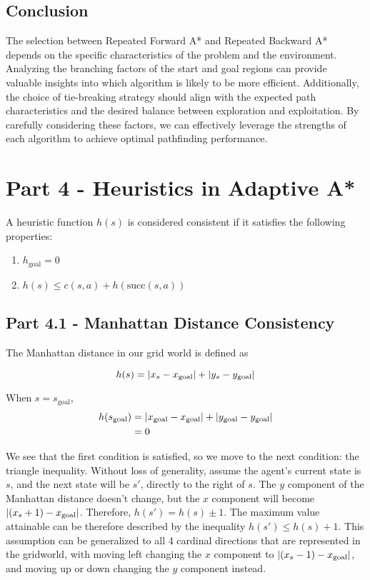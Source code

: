 \documentclass[12pt]{article}
\begin{document}
\subsection{Conclusion}

The selection between Repeated Forward A* and Repeated Backward A* depends on the specific characteristics of the problem and the environment. 
Analyzing the branching factors of the start and goal regions can provide valuable insights into which algorithm is likely to be more efficient. 
Additionally, 
the choice of tie-breaking strategy should align with the expected path characteristics and the desired balance between exploration and exploitation. 
By carefully considering these factors, 
we can effectively leverage the strengths of each algorithm to achieve optimal pathfinding performance. 



\section{Part 4 - Heuristics in Adaptive A*}

A heuristic function 
$h(s)$ 
is considered consistent if it satisfies the following properties:

\begin{enumerate}
    \item $h_{\text{goal}} = 0$
    \item $h(s) \leq c(s, a) + h(\text{succ} (s, a))$
\end{enumerate}

\subsection{Part 4.1 - Manhattan Distance Consistency}

The Manhattan distance in our grid world is defined as

$$
h(s) = \left\lvert x_s - x_{\text{goal}} \right\rvert + \left\lvert y_s - y_{\text{goal}} \right\rvert
$$

When $s = s_\text{goal}$,
\begin{align*}
h(s_\text{goal}) &= \left\lvert x_{\text{goal}} - x_{\text{goal}} \right\rvert + \left\lvert y_{\text{goal}} - y_{\text{goal}} \right\rvert \\
&= 0\
\end{align*}

We see that the first condition is satisfied,
so we move to the next condition:
the triangle inequality.
Without loss of generality,
assume the agent's current state is $s$,
and the next state will be $s'$,
directly to the right of $s$.
The $y$ component of the Manhattan distance doesn't change,
but the $x$ component will become 
$\left\lvert(x_s + 1) - x_{\text{goal}} \right\rvert$.
Therefore,
$h(s') = h(s) \pm 1$.
The maximum value attainable can be therefore described by the inequality 
$h(s') \leq h(s) + 1$.
This assumption can be generalized to all 4 cardinal directions that are represented in the gridworld,
with moving left changing the $x$ component to $\left\lvert(x_s - 1) - x_{\text{goal}} \right\rvert$,
and moving up or down changing the $y$ component instead.
\end{document}

